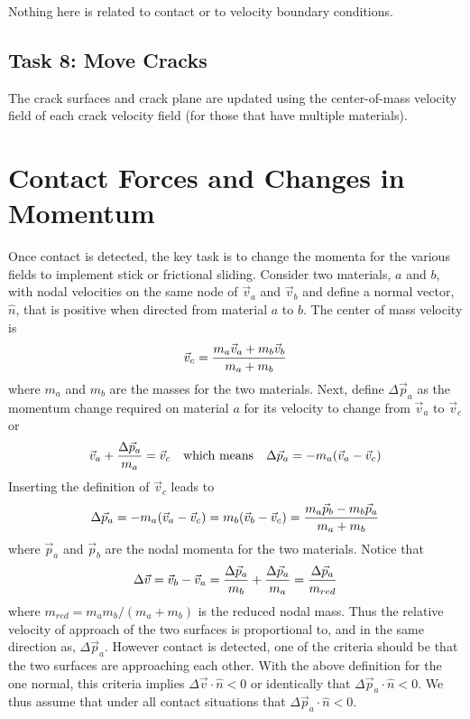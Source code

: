 \documentclass[11pt]{article}
\begin{document}
Nothing here is related to contact or to velocity boundary conditions.

\subsection{Task 8: Move Cracks}

The crack surfaces and crack plane are updated using the center-of-mass velocity field of each crack velocity field (for those that have multiple materials).

\section{Contact Forces and Changes in Momentum}

Once contact is detected, the key task is to change the momenta for the various fields to implement stick or frictional sliding. Consider two materials, $a$ and $b$, with nodal velocities on the same node of $\vec v_a$ and $\vec v_b$ and define a normal vector, $\hat n$, that is positive when directed from material $a$ to $b$. The center of mass velocity is
\begin{equation}
     \vec v_c = {m_a \vec v_a + m_b \vec v_b\over m_a + m_b}
\end{equation}
where $m_a$ and $m_b$ are the masses for the two materials. Next, define $\Delta\vec p_a$ as the momentum change required on material $a$ for its velocity to change from $\vec v_a$ to $\vec v_c$ or
\begin{equation}
         \vec v_a + {\Delta\vec p_a\over m_a} = \vec v_c \quad{\rm which\ means}\quad  \Delta \vec p_a = -m_a(\vec v_a -\vec v_c)
\end{equation}
Inserting the definition of $\vec v_c$ leads to
\begin{equation}
       \Delta \vec p_a = -m_a(\vec v_a -\vec v_c) = m_b (\vec v_b -\vec v_c) = {m_a\vec p_b-m_b\vec p_a\over m_a+m_b}
\end{equation}
where $\vec p_a$ and $\vec p_b$ are the nodal momenta for the two materials. Notice that
\begin{equation}
    \Delta \vec v = \vec v_b - \vec v_a = {\Delta \vec p_a\over m_b} + {\Delta \vec p_a\over m_a} = {\Delta\vec p_a\over m_{red}}
\end{equation}
where $m_{red} = m_am_b/(m_a+m_b)$ is the reduced nodal mass. Thus the relative velocity of approach of the two surfaces is proportional to, and in the same direction as, $\Delta \vec p_a$. However contact is detected, one of the criteria should be that the two surfaces are approaching each other. With the above definition for the one normal, this criteria implies $\Delta\vec v\cdot\hat n<0$ or identically that $\Delta\vec p_a\cdot\hat n<0$. We thus assume that under all contact situations that $\Delta\vec p_a\cdot\hat n<0$.
\end{document}
